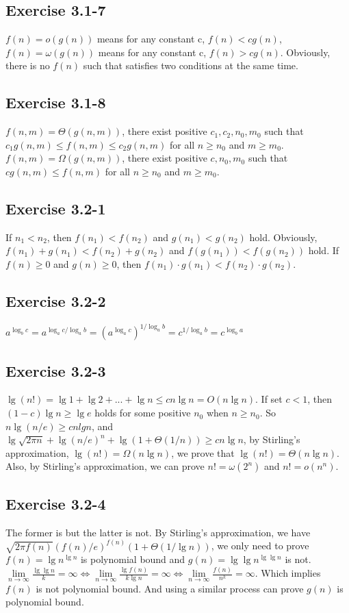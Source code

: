 \documentclass[12pt]{article}
\theoremstyle{definition}
\theoremstyle{remark}
\begin{document}
\subsection*{Exercise 3.1-7}
$f(n)=o(g(n))$ means for any constant c, $f(n) < cg(n)$, $f(n)=\omega(g(n))$ means for any constant c, $f(n) > cg(n)$. Obviously, there is no $f(n)$ such that satisfies two conditions at the same time.
\subsection*{Exercise 3.1-8}
$f(n,m)=\Theta(g(n,m))$, there exist positive $c_1, c_2, n_0, m_0$ such that $c_1g(n,m)\le f(n,m)\le c_2g(n,m)$ for all $n\ge n_0$ and $m\ge m_0$.$f(n,m)=\Omega(g(n,m))$, there exist positive $c, n_0, m_0$ such that $cg(n,m)\le f(n,m)$ for all $n\ge n_0$ and $m\ge m_0$.
\subsection*{Exercise 3.2-1}
If $n_1 < n_2$, then $f(n_1) < f(n_2)$ and $g(n_1) < g(n_2)$ hold. Obviously, $f(n_1)+g(n_1) < f(n_2)+g(n_2)$ and $f(g(n_1)) < f(g(n_2))$ hold. If $f(n)\ge 0$ and $g(n)\ge 0$, then $f(n_1)\cdot g(n_1) < f(n_2)\cdot g(n_2)$.
\subsection*{Exercise 3.2-2}
$a^{\log_bc}=a^{\log_ac/\log_ab}=(a^{\log_ac})^{1/\log_ab}=c^{1/\log_ab}=c^{\log_ba}$
\subsection*{Exercise 3.2-3}
$\lg(n!)=\lg1+\lg2+...+\lg{n}\le cn\lg{n}=O(n\lg{n})$. If set $c < 1$, then $(1-c)\lg{n}\ge \lg{e}$ holds for some positive $n_0$ when $n\ge n_0$. So $n\lg(n/e)\ge cnlgn$, and $\lg\sqrt{2\pi n}+\lg(n/e)^n+\lg(1+\Theta(1/n))\ge cn\lg{n}$, by Stirling's approximation, $\lg(n!)=\Omega(n\lg{n})$, we prove that $\lg(n!)=\Theta(n\lg{n})$. Also, by Stirling's approximation, we can prove $n!=\omega(2^n)$ and $n!=o(n^n)$.
\subsection*{Exercise 3.2-4}
The former is but the latter is not. By Stirling's approximation, we have $\sqrt{2\pi f(n)}(f(n)/e)^{f(n)}(1+\Theta (1/\lg{n}))$, we only need to prove $f(n)=\lg{n}^{\lg{n}}$ is polynomial bound  and $g(n)=\lg\lg{n}^{\lg\lg{n}}$ is not. $\lim\limits_{n\to\infty}\frac{\lg\lg n}{k}=\infty\Leftrightarrow\lim\limits_{n\to\infty}\frac{\lg f(n)}{k\lg n}=\infty\Leftrightarrow\lim\limits_{n\to\infty}\frac{f(n)}{n^k}=\infty$. Which implies $f(n)$ is not polynomial bound. And using a similar process can prove $g(n)$ is polynomial bound.
\end{document}
